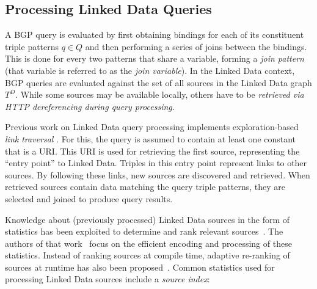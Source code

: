 \subsection{Processing Linked Data Queries} A BGP query is evaluated by
first obtaining bindings for each of its constituent triple patterns $q
\in Q$ and then performing a series of joins between the bindings. This is done for every two patterns that share a
variable, forming a \emph{join pattern} (that variable is referred to
as the \emph{join variable}). 
In the Linked Data context, BGP queries are 
evaluated against the set of all sources in the Linked Data graph $T^D$. 
While some sources may be available locally, others have
to be \emph{retrieved via HTTP dereferencing during query processing}. 

Previous work on Linked Data query processing
implements exploration-based \emph{link traversal} 
\cite{hartig_executing_2009,hartig_zero_2011}. 
For this, the query is assumed to contain at least one constant that is a URI. This URI is used for retrieving
the first source, representing the ``entry point'' to Linked Data. Triples in this entry point represent links to other sources. By following these links, new
sources are discovered and retrieved. When retrieved sources contain data matching the query triple patterns, they are selected and joined to produce query results. 

Knowledge about (previously processed) Linked Data sources in the form of statistics has been exploited 
to determine and rank relevant sources~\cite{harth_data_2010}. 
The authors of that work~\cite{harth_data_2010} focus on the efficient encoding and processing of these statistics. Instead of ranking sources at compile time, adaptive re-ranking of sources at runtime has also been proposed~\cite{ladwig_linked_2010}. Common statistics used for processing Linked Data sources include a \emph{source index}:


